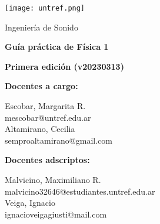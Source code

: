 \documentclass[a4paper,12pt,twoside]{book}
\begin{document}
\pagestyle{fancy}
\fancyhf{}
\chead{\scriptsize \nouppercase\rightmark}
\cfoot{\scriptsize \thepage}
\renewcommand{\headrulewidth}{0pt}

\frontmatter

\begin{center}
    \texttt{[image: untref.png]}
    
    \vspace{10em}
    
    \begin{Large}
        Ingeniería de Sonido
    \end{Large}
    
    \vspace{2em}
    
    \begin{Huge}
        \textbf{Guía práctica de Física 1}
    \end{Huge}

    \vspace{2em}
    
    \textbf{Primera edición (v20230313)}
    
    \vspace{20em}

    \begin{small}
        \textbf{Docentes a cargo:}
    \end{small}

    \vspace{1ex}
    
    Escobar, Margarita R.
    \\
    mescobar@untref.edu.ar
    \\ \vspace{1em}
    Altamirano, Cecilia
    \\
    semproaltamirano@gmail.com
    \\ \vspace{1em}

    \begin{small}
        \textbf{Docentes adscriptos:}
    \end{small}

    \vspace{1ex}
    
    Malvicino, Maximiliano R.
    \\
    malvicino32646@estudiantes.untref.edu.ar
    \\ \vspace{1em}
    Veiga, Ignacio
    \\
    ignacioveigagiusti@mail.com

\end{center}
\end{document}
